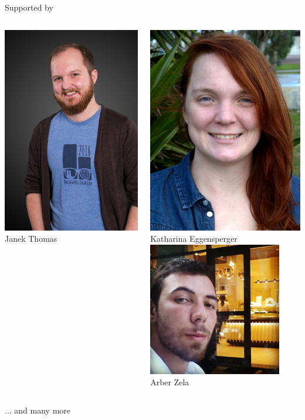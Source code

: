 \begin{frame}[c]{Supported by}
\begin{columns}
	\includegraphics[width=.3\textwidth]{images/thomas.jpg}\\
	Janek Thomas
	
		\centering
		\includegraphics[width=.3\textwidth]{images/eggensperger_small.jpg}\\
	Katharina Eggensperger\\[1.em]
	
	\includegraphics[width=.3\textwidth]{images/arber_small.jpg}\\
    Arber Zela
    
\end{columns}

\bigskip
... and many more


\end{frame}


